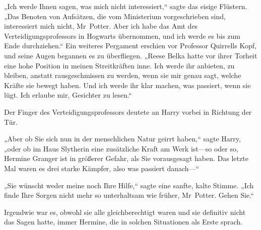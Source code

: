 „Ich werde Ihnen sagen, was mich nicht interessiert,“ sagte das eisige Flüstern. „Das Benoten von Aufsätzen, die vom Ministerium vorgeschrieben sind, interessiert mich nicht, Mr~Potter. Aber ich habe das Amt des Verteidigungsprofessors in Hogwarts übernommen, und ich werde es bis zum Ende durchziehen.“ Ein weiteres Pergament erschien vor Professor Quirrells Kopf, und seine Augen begannen es zu überfliegen. „Reese Belka hatte vor ihrer Torheit eine hohe Position in meinen Streitkräften inne. Ich werde ihr anbieten, zu bleiben, anstatt rausgeschmissen zu werden, wenn sie mir genau sagt, welche Kräfte sie bewegt haben. Und ich werde ihr klar machen, was passiert, wenn sie lügt. Ich erlaube mir, Gesichter zu lesen.“

Der Finger des Verteidigungsprofessors deutete an Harry vorbei in Richtung der Tür.

„Aber ob Sie sich nun in der menschlichen Natur geirrt haben,“ sagte Harry, „oder ob im Haus Slytherin eine zusätzliche Kraft am Werk ist—so oder so, Hermine Granger ist in größerer Gefahr, als Sie vorausgesagt haben. Das letzte Mal waren es drei starke Kämpfer, also was passiert danach—“

„Sie wünscht weder meine noch Ihre Hilfe,“ sagte eine sanfte, kalte Stimme. „Ich finde Ihre Sorgen nicht mehr so unterhaltsam wie früher, Mr~Potter. Gehen Sie.“

\later

Irgendwie war es, obwohl sie alle gleichberechtigt waren und sie definitiv nicht das Sagen hatte, immer Hermine, die in solchen Situationen als Erste sprach.

